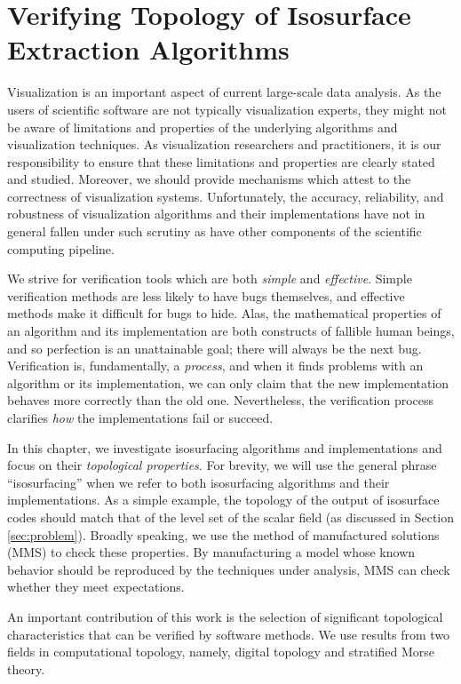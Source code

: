 \chapter{Verifying Topology of Isosurface Extraction Algorithms}\label{chap:topology}

Visualization is an important aspect of current large-scale
data analysis.
%
As the users of scientific software are not typically visualization
experts,
%
they might not be aware of limitations
and properties of the underlying algorithms and visualization
techniques.
%
As visualization researchers and practitioners, it is our responsibility to
ensure that these limitations and properties are clearly stated and studied.
%
Moreover, we should provide mechanisms which attest to the correctness of 
visualization systems.
%
Unfortunately, the accuracy, reliability, and robustness of visualization
algorithms and their implementations have not in general fallen under
such scrutiny as have other components of the scientific computing
pipeline.


We strive for verification tools which are both \emph{simple} and
\emph{effective}. Simple verification methods are less likely to have
bugs themselves, and effective methods make it difficult for bugs to
hide.  Alas, the mathematical properties of an algorithm and its
implementation are both constructs of fallible human beings, and so
perfection is an unattainable goal; there will always be the next
bug. Verification is, fundamentally, a \emph{process}, and when it
finds problems with an algorithm or its implementation, we can only
claim that the new implementation behaves more correctly than the old
one.  Nevertheless, the verification process clarifies \emph{how} the
implementations fail or succeed.

In this chapter, we investigate isosurfacing algorithms and
implementations and focus on their \emph{topological properties}. For
brevity, we will use the general phrase ``isosurfacing'' when we refer
to both isosurfacing algorithms and their implementations.
%
As a simple example, the topology of the output of isosurface codes
should match that of the level set of the scalar field (as discussed
in Section \ref{sec:problem}).
%
Broadly speaking, we use the method of manufactured solutions (MMS) to
check these properties.
%
By manufacturing a model whose known behavior should be reproduced by
the techniques under analysis, MMS can check whether they meet
expectations.

An important contribution of this work is the selection of
significant topological characteristics that can be verified by
software methods.
%
We use results from two fields in computational topology, namely,
digital topology and stratified Morse theory.


